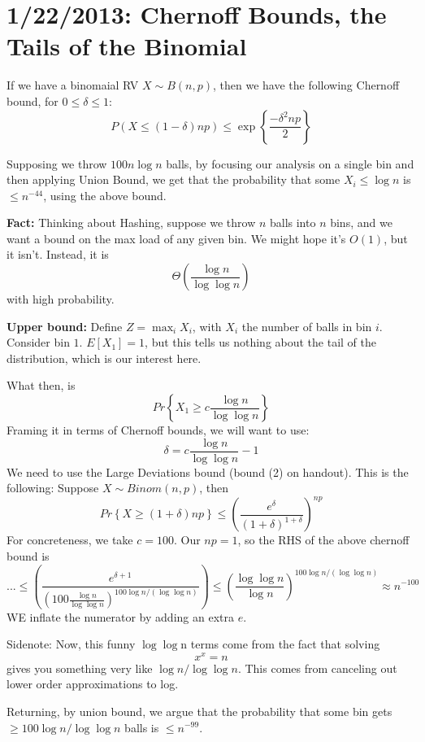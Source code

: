 \documentclass{article}
\begin{document}
\section{1/22/2013: Chernoff Bounds, the Tails of the Binomial}

If we have a  binomaial RV $X\sim B(n,p)$, then we have the following
 Chernoff bound, for $0\leq \delta \leq 1$:
$$
P(X\leq (1-\delta) np) \leq
\exp\left\{
	\frac{-\delta^2 np} {2}
\right\}
$$

Supposing we throw $100 n\log n$ balls, by focusing our analysis on a single bin
and then applying Union Bound, we get that the probability that 
some $X_i \leq \log n$ is $\leq n^{-44}$, using the above bound.

\textbf{Fact:}
Thinking about Hashing, suppose we throw $n$ balls into $n$ bins, and we want a bound on the max load of any given bin.
We might hope it's $O(1)$, but it isn't.
Instead, it is
$$
\Theta\left(
	\frac{\log n} {\log \log n}
\right)
$$
with high probability.

\textbf{Upper bound:}
Define $Z = \max_i X_i$, with $X_i$ the number of balls in bin $i$.
Consider bin $1$.
$E[X_1] = 1$, but this tells us nothing about the tail of the distribution,
which is our interest here.

What then, is
$$
Pr\left\{
	X_1 \geq c\frac{\log n}{ \log\log n}
\right\}
$$
Framing it in terms of Chernoff bounds, we will want to use:
$$
\delta = c\frac{\log n}{ \log\log n} - 1 
$$
We need to use the Large Deviations bound (bound (2) on handout).
This is the following:
Suppose $X\sim Binom(n,p)$, then
$$
Pr\left\{
	X\geq (1 + \delta) np
\right\}
\leq
\left(
	\frac{e^\delta}{(1+\delta)^{1+\delta}}
\right)
^{np}
$$
For concreteness, we take $c=100$.
Our $np=1$, so the RHS of the above chernoff bound is
$$
... \leq
\left(
\frac{e^{\delta + 1}}
{	\left(100 \frac{\log n}{\log \log n} \right) ^ {100 \log n / (\log \log n)}}
\right) 
\leq
\left(
	\frac{\log\log n}{\log n}
\right) ^ {100 \log n / (\log \log n)}
\approx
n^{-100}
$$
WE inflate the numerator by adding an extra $e$.

Sidenote:
Now, this funny $\log\log $n terms come from the fact that solving
$$
x^x = n
$$
gives you something very like $\log n / \log\log n$.
This comes from canceling out lower order approximations to log.

Returning, by union bound, we argue that the probability that some bin gets $\geq 100 \log n / \log\log n$ balls is $\leq n^{-99}$.
\end{document}

